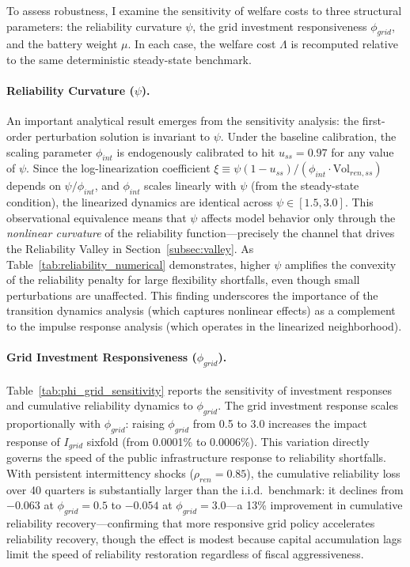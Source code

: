 \documentclass[12pt, a4paper]{article}
\begin{document}
To assess robustness, I examine the sensitivity of welfare costs to three structural parameters: the reliability curvature $\psi$, the grid investment responsiveness $\phi_{grid}$, and the battery weight $\mu$. In each case, the welfare cost $\Lambda$ is recomputed relative to the same deterministic steady-state benchmark.

\paragraph{Reliability Curvature ($\psi$).} An important analytical result emerges from the sensitivity analysis: the first-order perturbation solution is invariant to $\psi$. Under the baseline calibration, the scaling parameter $\phi_{int}$ is endogenously calibrated to hit $u_{ss} = 0.97$ for any value of $\psi$. Since the log-linearization coefficient $\xi \equiv \psi(1-u_{ss})/(\phi_{int} \cdot \text{Vol}_{ren,ss})$ depends on $\psi / \phi_{int}$, and $\phi_{int}$ scales linearly with $\psi$ (from the steady-state condition), the linearized dynamics are identical across $\psi \in [1.5, 3.0]$. This observational equivalence means that $\psi$ affects model behavior only through the \textit{nonlinear curvature} of the reliability function---precisely the channel that drives the Reliability Valley in Section~\ref{subsec:valley}. As Table~\ref{tab:reliability_numerical} demonstrates, higher $\psi$ amplifies the convexity of the reliability penalty for large flexibility shortfalls, even though small perturbations are unaffected. This finding underscores the importance of the transition dynamics analysis (which captures nonlinear effects) as a complement to the impulse response analysis (which operates in the linearized neighborhood).

\paragraph{Grid Investment Responsiveness ($\phi_{grid}$).} Table~\ref{tab:phi_grid_sensitivity} reports the sensitivity of investment responses and cumulative reliability dynamics to $\phi_{grid}$. The grid investment response scales proportionally with $\phi_{grid}$: raising $\phi_{grid}$ from 0.5 to 3.0 increases the impact response of $I_{grid}$ sixfold (from 0.0001\% to 0.0006\%). This variation directly governs the speed of the public infrastructure response to reliability shortfalls. With persistent intermittency shocks ($\rho_{ren}=0.85$), the cumulative reliability loss over 40 quarters is substantially larger than the i.i.d.\ benchmark: it declines from $-0.063$ at $\phi_{grid} = 0.5$ to $-0.054$ at $\phi_{grid} = 3.0$---a 13\% improvement in cumulative reliability recovery---confirming that more responsive grid policy accelerates reliability recovery, though the effect is modest because capital accumulation lags limit the speed of reliability restoration regardless of fiscal aggressiveness.
\end{document}
